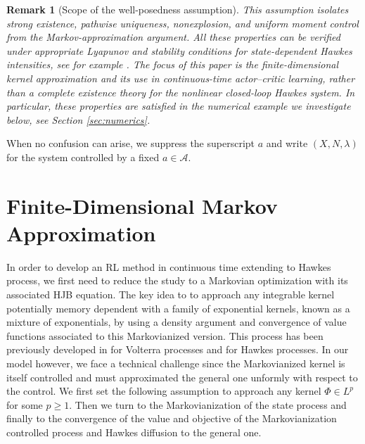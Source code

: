 \documentclass[11pt]{article}
\theoremstyle{remarkitalic}
\theoremstyle{remarkitalic}
\newtheorem{remark}[theorem]{Remark}
\newcommand{\1}{\mathbf 1}
\def\t{\textcolor[rgb]{1.00,0.00,1.00}{ Tom: }\textcolor[rgb]{1.00,0.00,1.00}}
\begin{document}
\begin{remark}[Scope of the well-posedness assumption]
This assumption isolates strong existence,
pathwise uniqueness, nonexplosion, and uniform moment control from the
Markov-approximation argument. All these properties can be verified under
appropriate Lyapunov and stability conditions for state-dependent
Hawkes intensities, see for example \cite[Proposition 1.4]{KhabouTalbi2025}. The focus of this paper is the finite-dimensional
kernel approximation and its use in continuous-time actor--critic
learning, rather than a complete existence theory for the nonlinear
closed-loop Hawkes system. In particular, these properties are satisfied in the numerical example we investigate below, see Section \ref{sec:numerics}.
\end{remark}



When no confusion can arise, we suppress the superscript $a$ and write
$(X,N,\lambda)$ for the system controlled by a fixed
$a\in\mathcal A$.

\section{Finite-Dimensional Markov Approximation}
\label{sec:markov_approx}



In order to develop an RL method in continuous time extending \cite{ChengGuoZhang2026} to Hawkes process, we first need to reduce the study to a Markovian optimization with its associated HJB equation. The key idea to to approach any integrable kernel potentially memory dependent with a family of exponential kernels, known as a mixture of exponentials, by using a density argument and convergence of value functions associated to this Markovianized version. This process has been previously developed in \cite{abi2019multifactor} for Volterra processes and \cite{KhabouTalbi2025} for Hawkes processes. In our model however, we face a technical challenge since the Markovianized kernel is itself controlled and must approximated the general one unformly with respect to the control. We first set the following assumption to approach any kernel $\Phi\in L^p$ for some $p\geq 1$. Then we turn to the Markovianization of the state process and finally to the convergence of  the value and objective of the Markovianization controlled process and Hawkes diffusion to the general one.  
\end{document}
